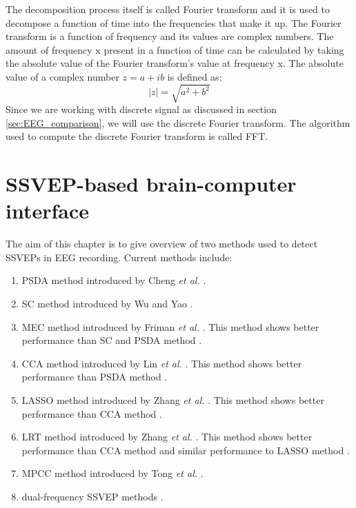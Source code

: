 The decomposition process itself is called Fourier transform and it is used to decompose a function of time into the frequencies that make it up. The Fourier transform is a function of frequency and its values are complex numbers. The amount of frequency x present in a function of time can be calculated by taking the absolute value of the Fourier transform's value at frequency x. The absolute value of a complex number $z=a+ib$ is defined as:
\begin{equation}
	|z|=\sqrt{a^2+b^2}
\end{equation}
Since we are working with discrete signal as discussed in section \ref{sec:EEG_comparison}, we will use the discrete Fourier transform. The algorithm used to compute the discrete Fourier transform is called \gls{FFT}.

\section{SSVEP-based brain-computer interface}
\label{sec:SSVEP_detection}
The aim of this chapter is to give overview of two methods used to detect \glspl{SSVEP} in \gls{EEG} recording. Current methods include:
\begin{enumerate}
	\item \gls{PSDA} method introduced by Cheng \emph{et al.} \cite{psda}.
	\item \gls{SC} method introduced by Wu and Yao \cite{sc}.
	\item \gls{MEC} method introduced by Friman \emph{et al.} \cite{mec}. This method shows better performance than \gls{SC} and \gls{PSDA} method \cite{mec_comparison}.
	\item \gls{CCA} method introduced by Lin \emph{et al.} \cite{cca_lin}. This method shows better performance than \gls{PSDA} method \cite{bin2009cca}.
	\item \gls{LASSO} method introduced by Zhang \emph{et al.} \cite{LASSO}. This method shows better performance than \gls{CCA} method \cite{LASSO}.
	\item \gls{LRT} method introduced by Zhang \emph{et al.} \cite{LRT}. This method shows better performance than \gls{CCA} method and similar performance to \gls{LASSO} method \cite{LRT}.
	\item \gls{MPCC} method introduced by Tong \emph{et al.} \cite{MPCC}.
	\item dual-frequency \gls{SSVEP} methods \cite{dual1, dual2}.
\end{enumerate}

